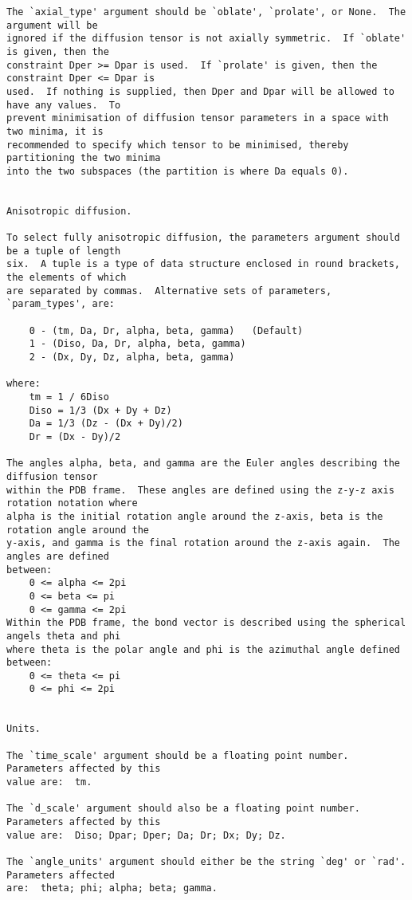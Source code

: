 {\begin{verbatim}
The `axial_type' argument should be `oblate', `prolate', or None.  The argument will be
ignored if the diffusion tensor is not axially symmetric.  If `oblate' is given, then the
constraint Dper >= Dpar is used.  If `prolate' is given, then the constraint Dper <= Dpar is
used.  If nothing is supplied, then Dper and Dpar will be allowed to have any values.  To
prevent minimisation of diffusion tensor parameters in a space with two minima, it is
recommended to specify which tensor to be minimised, thereby partitioning the two minima
into the two subspaces (the partition is where Da equals 0).


Anisotropic diffusion.

To select fully anisotropic diffusion, the parameters argument should be a tuple of length
six.  A tuple is a type of data structure enclosed in round brackets, the elements of which
are separated by commas.  Alternative sets of parameters, `param_types', are:

    0 - (tm, Da, Dr, alpha, beta, gamma)   (Default)
    1 - (Diso, Da, Dr, alpha, beta, gamma)
    2 - (Dx, Dy, Dz, alpha, beta, gamma)

where:
    tm = 1 / 6Diso
    Diso = 1/3 (Dx + Dy + Dz)
    Da = 1/3 (Dz - (Dx + Dy)/2)
    Dr = (Dx - Dy)/2

The angles alpha, beta, and gamma are the Euler angles describing the diffusion tensor
within the PDB frame.  These angles are defined using the z-y-z axis rotation notation where
alpha is the initial rotation angle around the z-axis, beta is the rotation angle around the
y-axis, and gamma is the final rotation around the z-axis again.  The angles are defined
between:
    0 <= alpha <= 2pi
    0 <= beta <= pi
    0 <= gamma <= 2pi
Within the PDB frame, the bond vector is described using the spherical angels theta and phi
where theta is the polar angle and phi is the azimuthal angle defined between:
    0 <= theta <= pi
    0 <= phi <= 2pi


Units.

The `time_scale' argument should be a floating point number.  Parameters affected by this
value are:  tm.

The `d_scale' argument should also be a floating point number.  Parameters affected by this
value are:  Diso; Dpar; Dper; Da; Dr; Dx; Dy; Dz.

The `angle_units' argument should either be the string `deg' or `rad'.  Parameters affected
are:  theta; phi; alpha; beta; gamma.




\end{verbatim}}
